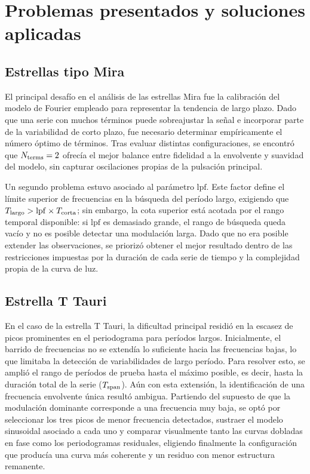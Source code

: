 \documentclass[letterpaper,12pt]{extarticle}
\begin{document}
\section{Problemas presentados y soluciones aplicadas}

\subsection{Estrellas tipo Mira}

El principal desafío en el análisis de las estrellas Mira fue la calibración del modelo de Fourier empleado para representar la tendencia de largo plazo. Dado que una serie con muchos términos puede sobreajustar la señal e incorporar parte de la variabilidad de corto plazo, fue necesario determinar empíricamente el número óptimo de términos. Tras evaluar distintas configuraciones, se encontró que $N_{\rm terms} = 2$ ofrecía el mejor balance entre fidelidad a la envolvente y suavidad del modelo, sin capturar oscilaciones propias de la pulsación principal.

Un segundo problema estuvo asociado al parámetro $\mathrm{lpf}$. Este factor define el límite superior de frecuencias en la búsqueda del período largo, exigiendo que $T_{\rm largo} > \mathrm{lpf}\times T_{\rm corta}$; sin embargo, la cota superior está acotada por el rango temporal disponible: si $\mathrm{lpf}$ es demasiado grande, el rango de búsqueda queda vacío y no es posible detectar una modulación larga. Dado que no era posible extender las observaciones, se priorizó obtener el mejor resultado dentro de las restricciones impuestas por la duración de cada serie de tiempo y la complejidad propia de la curva de luz.

\subsection{Estrella T Tauri}

En el caso de la estrella T Tauri, la dificultad principal residió en la escasez de picos prominentes en el periodograma para períodos largos. Inicialmente, el barrido de frecuencias no se extendía lo suficiente hacia las frecuencias bajas, lo que limitaba la detección de variabilidades de largo período. Para resolver esto, se amplió el rango de períodos de prueba hasta el máximo posible, es decir, hasta la duración total de la serie ($T_{\rm span}$). Aún con esta extensión, la identificación de una frecuencia envolvente única resultó ambigua. Partiendo del supuesto de que la modulación dominante corresponde a una frecuencia muy baja, se optó por seleccionar los tres picos de menor frecuencia detectados, sustraer el modelo sinusoidal asociado a cada uno y comparar visualmente tanto las curvas dobladas en fase como los periodogramas residuales, eligiendo finalmente la configuración que producía una curva más coherente y un residuo con menor estructura remanente.
\end{document}
